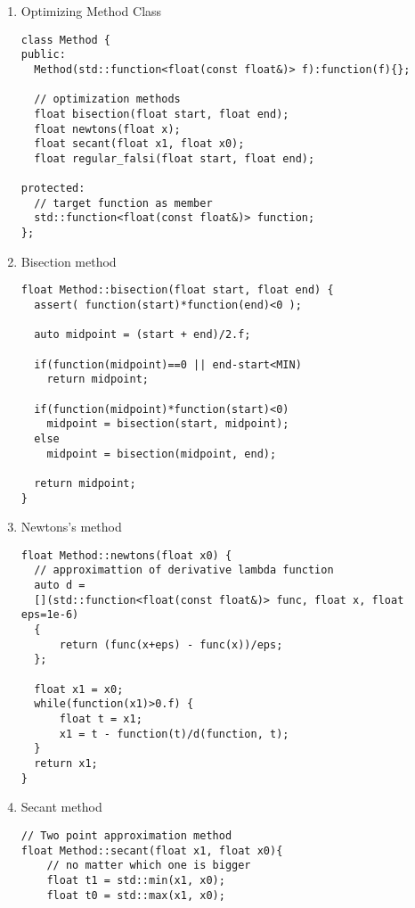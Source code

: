 \documentclass[12pt,letterpaper]{article}
\begin{document}
\begin{enumerate}

\item Optimizing Method Class
\begin{lstlisting}[style=C++]
class Method {
public:
  Method(std::function<float(const float&)> f):function(f){};

  // optimization methods
  float bisection(float start, float end);
  float newtons(float x);
  float secant(float x1, float x0);
  float regular_falsi(float start, float end);

protected:
  // target function as member
  std::function<float(const float&)> function;
};
\end{lstlisting}

\item Bisection method
\begin{lstlisting}[style=C++]
float Method::bisection(float start, float end) {
  assert( function(start)*function(end)<0 );

  auto midpoint = (start + end)/2.f;

  if(function(midpoint)==0 || end-start<MIN)
    return midpoint;

  if(function(midpoint)*function(start)<0)
    midpoint = bisection(start, midpoint);
  else
    midpoint = bisection(midpoint, end);

  return midpoint;
}
\end{lstlisting}

\newpage

\item Newtons's method
\begin{lstlisting}[style=C++]
float Method::newtons(float x0) {
  // approximattion of derivative lambda function
  auto d = 
  [](std::function<float(const float&)> func, float x, float eps=1e-6) 
  { 
      return (func(x+eps) - func(x))/eps;
  };

  float x1 = x0;
  while(function(x1)>0.f) {
      float t = x1;
      x1 = t - function(t)/d(function, t);
  }
  return x1;
}
\end{lstlisting}

\item Secant method
\begin{lstlisting}[style=C++]
// Two point approximation method
float Method::secant(float x1, float x0){
    // no matter which one is bigger
    float t1 = std::min(x1, x0);
    float t0 = std::max(x1, x0);


\end{lstlisting}
\end{enumerate}
\end{document}

